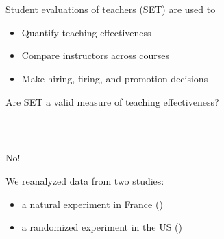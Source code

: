 \documentclass{beamer}
\begin{document}
\frame
{
  \frametitle{ ~}
 \begin{center}
 \Large{ Student evaluations of teachers (SET) are used to} \\
  \begin{itemize}
  \item Quantify teaching effectiveness
  \item Compare instructors across courses
  \item Make hiring, firing, and promotion decisions  
  \end{itemize}
  \vfill
Are SET a valid measure of teaching effectiveness?
\end{center}
}

\frame
{
  \frametitle{ ~}
  \begin{center}
  \Huge{No!}
  \end{center}

\vfill
\Large

We reanalyzed data from two studies: 
\begin{itemize}
\item a natural experiment in France (\cite{Boring2015})
\item a randomized experiment in the US (\cite{MacNell2014})
\end{itemize}


}
\end{document}
